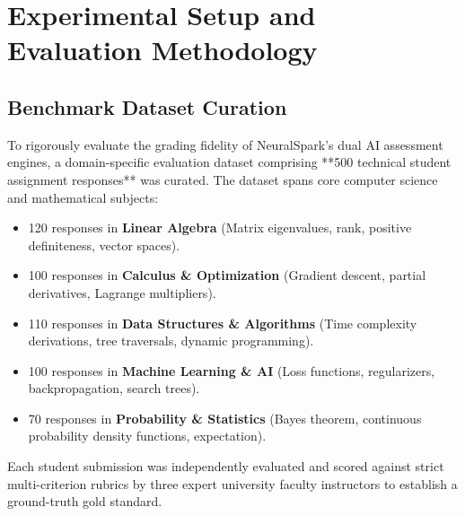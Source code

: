 \section{Experimental Setup and Evaluation Methodology}

\subsection{Benchmark Dataset Curation}
To rigorously evaluate the grading fidelity of NeuralSpark's dual AI assessment engines, a domain-specific evaluation dataset comprising **500 technical student assignment responses** was curated. The dataset spans core computer science and mathematical subjects:
\begin{itemize}[leftmargin=*]
    \item 120 responses in \textbf{Linear Algebra} (Matrix eigenvalues, rank, positive definiteness, vector spaces).
    \item 100 responses in \textbf{Calculus \& Optimization} (Gradient descent, partial derivatives, Lagrange multipliers).
    \item 110 responses in \textbf{Data Structures \& Algorithms} (Time complexity derivations, tree traversals, dynamic programming).
    \item 100 responses in \textbf{Machine Learning \& AI} (Loss functions, regularizers, backpropagation, search trees).
    \item 70 responses in \textbf{Probability \& Statistics} (Bayes theorem, continuous probability density functions, expectation).
\end{itemize}
Each student submission was independently evaluated and scored against strict multi-criterion rubrics by three expert university faculty instructors to establish a ground-truth gold standard.

